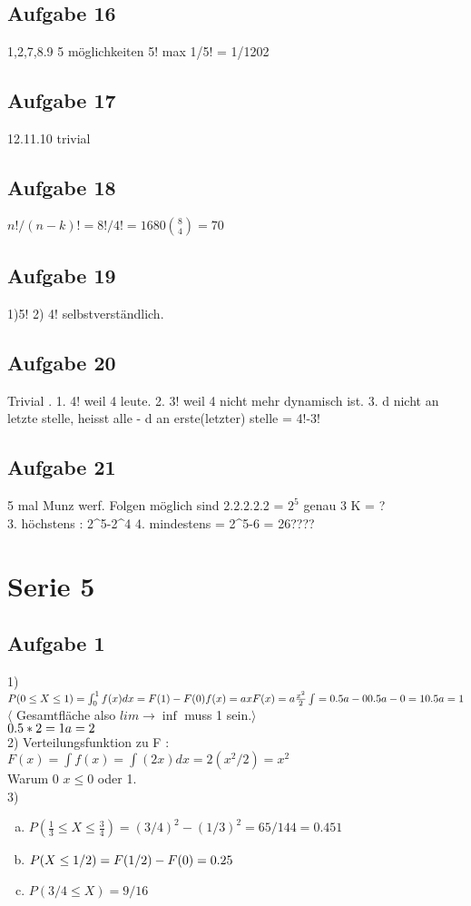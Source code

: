 \documentclass[a4paper,10pt]{scrbook}
\begin{document}
\section*{Aufgabe 16} 1,2,7,8.9 5 möglichkeiten 5! max 1/5! = 1/1202
\section*{Aufgabe 17} 12.11.10 trivial
\section*{Aufgabe 18} $n!/(n-k)! = 8!/4! = 1680  {8 \choose 4} = 70$
\section*{Aufgabe 19} 1)5! 2) 4! selbstverständlich.
\section*{Aufgabe 20} Trivial . 1. 4! weil 4 leute. 2. 3! weil 4 nicht mehr dynamisch ist. 3. d nicht an letzte stelle, 
heisst alle - d an erste(letzter) stelle = 4!-3!
\section*{Aufgabe 21} 5 mal Munz werf. Folgen möglich sind 2.2.2.2.2 = $2^5$ genau 3 K = ?\\
3. höchstens : 2^5-2^4
4. mindestens = 2^5-6 = 26????

\chapter*{Serie 5}
\section*{Aufgabe 1}
1) $P(0\leq X \leq 1) = \int_0^1 f(x)dx = F(1)-F(0)\\
f(x) = ax\\
F(x) = a \frac{x^2}{2} \\
\int = 0.5a - 0\\
0.5a -0 = 1 \\
0.5a = 1\\$ $\langle$ Gesamtfläche also $ lim \rightarrow \inf$ muss 1 sein.$\rangle$ \\
$0.5 * 2 = 1\\
a = 2$\\

2) Verteilungsfunktion zu F : \\
$F(x) = \int f(x) = \int (2x) dx = 2(x^2/2) = x^2 $\\
Warum 0 $ x \le 0$  oder 1.\\
3) \begin{enumerate}[a)]
    \item $P(\frac{1}{3} \le X \le \frac{3}{4}) = (3/4)^2 - (1/3)^2 = 65/144 = 0.451$
    \item $P(X \le 1/2) = F(1/2) - F(0) = 0.25\\$
    \item $P(3/4 \le X) = 9/16$ \\ 
   \end{enumerate}
\end{document}
